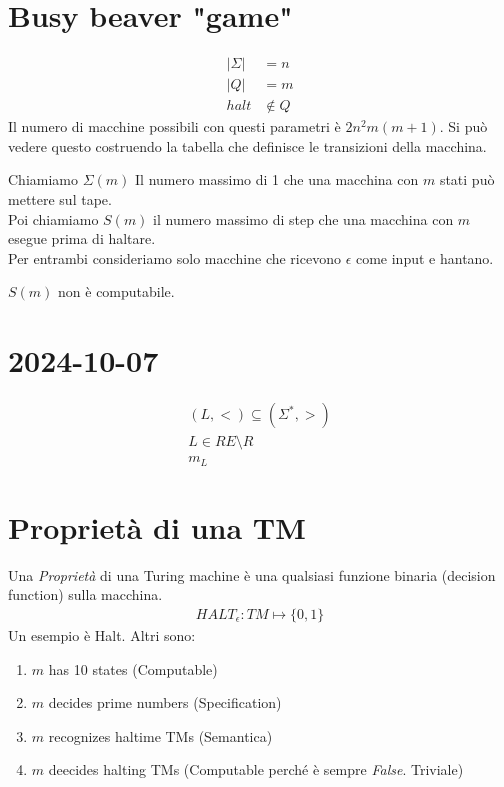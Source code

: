 \documentclass{article}
\begin{document}
\section{Busy beaver "game"}
\begin{align*}
    |\Sigma| &= n \\
    |Q| &= m \\
    halt &\not\in Q
\end{align*}
Il numero di macchine possibili con questi parametri è $2n^2m(m+1)$. Si può vedere questo costruendo la tabella che definisce le transizioni della macchina.

Chiamiamo $\Sigma(m)$ Il numero massimo di 1 che una macchina con $m$ stati può mettere sul tape.  \\
Poi chiamiamo $S(m)$ il numero massimo di step che una macchina con $m$ esegue prima di haltare. \\
Per entrambi consideriamo solo macchine che ricevono $\epsilon$ come input e hantano.

$S(m)$ non è computabile.

\section{2024-10-07}
\begin{gather*}
    (L,<)\subseteq (\Sigma^*,>) \\
    L\in RE \setminus R \\
    m_L
\end{gather*}

\section{Proprietà di una TM}
Una \textit{Proprietà} di una Turing machine è una qualsiasi funzione binaria (decision function) sulla macchina.
\begin{align*}
    HALT_\epsilon: TM \mapsto \{0,1\}
\end{align*}
Un esempio è Halt. Altri sono:
\begin{enumerate}
    \item $m$ has 10 states (Computable)
    \item $m$ decides prime numbers (Specification)
    \item $m$ recognizes haltime TMs (Semantica)
    \item $m$ deecides halting TMs (Computable perché è sempre \textit{False}. Triviale)
\end{enumerate}
\end{document}
